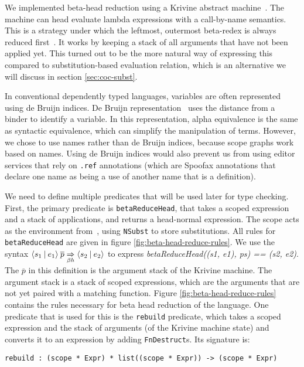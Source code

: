 We implemented beta-head reduction using a Krivine abstract machine~\cite{krivine}. The machine can head evaluate lambda expressions with a call-by-name semantics. This is a strategy under which the leftmost, outermost beta-redex is always reduced first~\cite{tapl}. It works by keeping a stack of all arguments that have not been applied yet. This turned out to be the more natural way of expressing this compared to substitution-based evaluation relation, which is an alternative we will discuss in section \ref{sec:coc-subst}.

In conventional dependently typed languages, variables are often represented using de Bruijn indices. De Bruijn representation~\cite[Section 6.1]{tapl} uses the distance from a binder to identify a variable. In this representation, alpha equivalence is the same as syntactic equivalence, which can simplify the manipulation of terms. However, we chose to use names rather than de Bruijn indices, because scope graphs work based on names. Using de Bruijn indices would also prevent us from using editor services that rely on \verb|.ref| annotations (which are Spoofax annotations that declare one name as being a use of another name that is a definition).

We need to define multiple predicates that will be used later for type checking. First, the primary predicate is \verb|betaReduceHead|, that takes a scoped expression and a stack of applications, and returns a head-normal expression. The scope acts as the environment from~\cite{krivine}, using \verb|NSubst| to store substitutions. All rules for \verb|betaReduceHead| are given in figure \ref{fig:beta-head-reduce-rules}. We use the syntax $\langle s_1 \: | \: e_1\rangle \: \overline{p} \underset{\beta h}{\Rightarrow} \langle s_2 \: | \: e_2\rangle$ to express \textit{betaReduceHead((s1, e1), ps) == (s2, e2)}. The $\overline{p}$ in this definition is the argument stack of the Krivine machine. The argument stack is a stack of scoped expressions, which are the arguments that are not yet paired with a matching function. Figure \ref{fig:beta-head-reduce-rules} contains the rules necessary for beta head reduction of the language. One predicate that is used for this is the \verb|rebuild| predicate, which takes a scoped expression and the stack of arguments (of the Krivine machine state) and converts it to an expression by adding \verb|FnDestruct|s. Its signature is:
\begin{lstlisting}
rebuild : (scope * Expr) * list((scope * Expr)) -> (scope * Expr)
\end{lstlisting}

